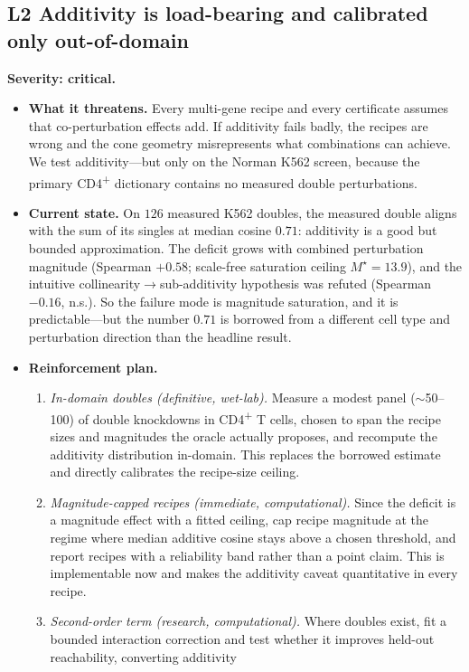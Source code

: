 \documentclass[11pt]{article}
\newcommand{\sev}[2]{\textcolor{#1}{\textbf{#2}}}
\begin{document}
\subsection{L2 \quad Additivity is load-bearing and calibrated only out-of-domain}
\sev{sev1}{Severity: critical.}
\begin{itemize}
\item[] \textbf{What it threatens.} Every multi-gene recipe and every certificate assumes that
co-perturbation effects add. If additivity fails badly, the recipes are wrong and the cone
geometry misrepresents what combinations can achieve. We test additivity---but only on the
Norman K562 screen, because the primary CD4\textsuperscript{+} dictionary contains no measured
double perturbations.
\item[] \textbf{Current state.} On $126$ measured K562 doubles, the measured double aligns with
the sum of its singles at median cosine $0.71$: additivity is a good but bounded approximation.
The deficit grows with combined perturbation magnitude (Spearman $+0.58$; scale-free saturation
ceiling $M^{\star}=13.9$), and the intuitive collinearity$\rightarrow$sub-additivity hypothesis
was refuted (Spearman $-0.16$, n.s.). So the failure mode is magnitude saturation, and it is
predictable---but the number $0.71$ is borrowed from a different cell type and perturbation
direction than the headline result.
\item[] \textbf{Reinforcement plan.}
\begin{enumerate}
\item \emph{In-domain doubles (definitive, wet-lab).} Measure a modest panel ($\sim$50--100) of
double knockdowns in CD4\textsuperscript{+} T cells, chosen to span the recipe sizes and
magnitudes the oracle actually proposes, and recompute the additivity distribution in-domain.
This replaces the borrowed estimate and directly calibrates the recipe-size ceiling.
\item \emph{Magnitude-capped recipes (immediate, computational).} Since the deficit is a
magnitude effect with a fitted ceiling, cap recipe magnitude at the regime where median additive
cosine stays above a chosen threshold, and report recipes with a reliability band rather than a
point claim. This is implementable now and makes the additivity caveat quantitative in every
recipe.
\item \emph{Second-order term (research, computational).} Where doubles exist, fit a bounded
interaction correction and test whether it improves held-out reachability, converting additivity

\end{enumerate}
\end{itemize}
\end{document}
